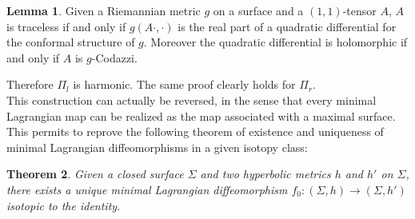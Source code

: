 \documentclass[10pt,a4paper,oneside,reqno]{book}
\theoremstyle{plain}
\newtheorem{theorem}{Theorem}[chapter] %
\theoremstyle{definition}
\newtheorem{lemma}[theorem]{Lemma} %
\theoremstyle{plain}
\theoremstyle{plain}
\theoremstyle{mystyleNormalFont}
\begin{document}
\begin{lemma}\label{lemma hopf}
Given a Riemannian metric $g$ on a surface and a $(1,1)$-tensor $A$, $A$ is traceless if and only if $g(A\cdot,\cdot)$ is the real part of a quadratic differential for the conformal structure of $g$. Moreover the quadratic differential is holomorphic if and only if $A$ is $g$-Codazzi.
\end{lemma}
 
Therefore $\Pi_l$ is harmonic. The same proof clearly holds for $\Pi_r$.\\ This construction can actually be reversed, in the sense that every minimal Lagrangian map can be realized as the  map associated with a maximal surface. This permits to reprove the following theorem of existence and uniqueness of minimal Lagrangian diffeomorphisms in a given isotopy class:

\begin{theorem}
Given a closed surface $\Sigma$ and two hyperbolic metrics $h$ and $h'$ on $\Sigma$, there exists a unique minimal Lagrangian diffeomorphism $f_0:(\Sigma,h)\to (\Sigma,h')$ isotopic to the identity.
\end{theorem}

\printbibliography
\end{document}
